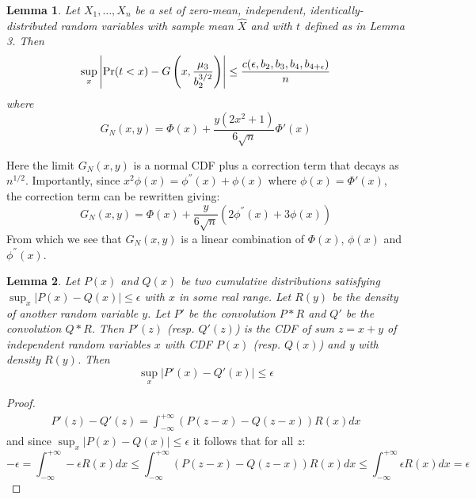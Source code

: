 \documentclass{article}
\newtheorem{lemma}{Lemma}
\begin{document}
\begin{lemma} Let $X_1,\ldots,X_n$ be
a set of zero-mean, independent, identically-distributed random variables with sample mean $\hat{X}$ and with $t$ defined as in Lemma 3. Then
\begin{equation}\label{eq:clt-bounds}
 \sup_x\left|{\rm Pr}(t<x) - G\left(x, \frac{\mu_3}{b_2^{3/2}}\right)\right| \leq \frac{c(\epsilon,b_2,b_3,b_4,b_{4+\epsilon})}{n}
\end{equation}
where
\begin{equation}
G_N(x,y) = \Phi(x) + \frac{y(2x^2+1)}{6\sqrt{n}}\Phi'(x)
\end{equation}
\end{lemma}
Here the limit $G_N(x,y)$ is a normal CDF plus a correction term that
decays as $n^{1/2}$. Importantly, since $x^2\phi(x) = \phi^{''}(x) + \phi(x)$ where $\phi(x)=\Phi'(x)$, the correction term can be rewritten giving:
\begin{equation}
G_N(x,y) = \Phi(x) + \frac{y}{6\sqrt{n}}(2\phi^{''}(x)+3\phi(x))
\end{equation}
From which we see that $G_N(x,y)$ is a linear combination of $\Phi(x)$, $\phi(x)$ and $\phi^{''}(x)$. 



\begin{lemma} Let $P(x)$ and $Q(x)$ be two cumulative distributions satisfying $\sup_x|P(x)-Q(x)|\leq \epsilon$ with
  $x$ in some real range. Let $R(y)$ be the {\em density} of another
  random variable $y$. Let $P'$ be the convolution $P*R$ and $Q'$ be
  the convolution $Q*R$. Then $P'(z)$ (resp. $Q'(z)$) is the CDF of sum
  $z=x+y$ of independent random variables $x$ with CDF $P(x)$ (resp. $Q(x)$) and y
  with density $R(y)$.  Then
  \begin{equation}
    \sup_x|P'(x)-Q'(x)|\leq \epsilon
  \end{equation}
  \end{lemma}
\begin{proof}
  \begin{equation}
    \begin{split}
      P'(z) - Q'(z) = \int_{-\infty}^{+\infty}(P(z-x)-Q(z-x))R(x) dx
    \end{split}
  \end{equation}
  and since $\sup_x|P(x)-Q(x)|\leq \epsilon$ it follows that for all $z$:
  \begin{equation}
- \epsilon = \int_{-\infty}^{+\infty} -\epsilon R(x) dx \leq \int_{-\infty}^{+\infty}(P(z-x)-Q(z-x))R(x) dx \leq \int_{-\infty}^{+\infty}\epsilon R(x) dx = \epsilon
  \end{equation}
\end{proof}
\end{document}
